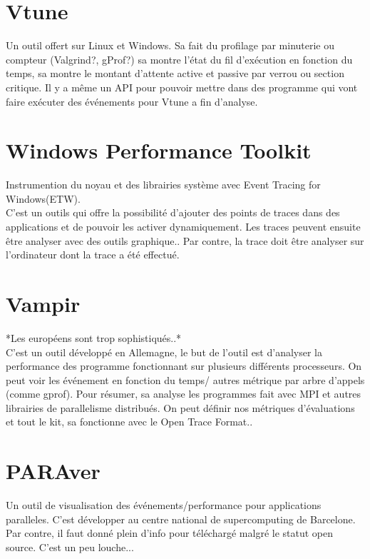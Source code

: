 \documentclass[oneside]{book}
\begin{document}
\section{Vtune}
Un outil offert sur Linux et Windows. Sa fait du profilage par minuterie ou compteur (Valgrind?, gProf?) sa montre l'état du fil d'exécution en fonction du temps, sa montre le montant d'attente active et passive par verrou ou section critique. Il y a même un API pour pouvoir mettre dans des programme qui vont faire exécuter des événements pour Vtune a fin d'analyse.\\

\section{Windows Performance Toolkit}
Instrumention du noyau et des librairies système avec Event Tracing for Windows(ETW). \\

C'est un outils qui offre la possibilité d'ajouter des points de traces dans des applications et de pouvoir les activer dynamiquement. Les traces peuvent ensuite être analyser avec des outils graphique.. Par contre, la trace doit être analyser sur l'ordinateur dont la trace a été effectué.


\section{Vampir}
*Les européens sont trop sophistiqués..* \\

C'est un outil développé en Allemagne, le but de l'outil est d'analyser la performance des programme fonctionnant sur plusieurs différents processeurs. On peut voir les événement en fonction du temps/ autres métrique par arbre d'appels (comme gprof). Pour résumer, sa analyse les programmes fait avec MPI et autres librairies de parallelisme distribués. On peut définir nos métriques d'évaluations et tout le kit, sa fonctionne avec le Open Trace Format..

\section{PARAver}
Un outil de visualisation des événements/performance pour applications paralleles. C'est développer au centre national de supercomputing de Barcelone. Par contre, il faut donné plein d'info pour téléchargé malgré le statut open source. C'est un peu louche... \\
\end{document}
